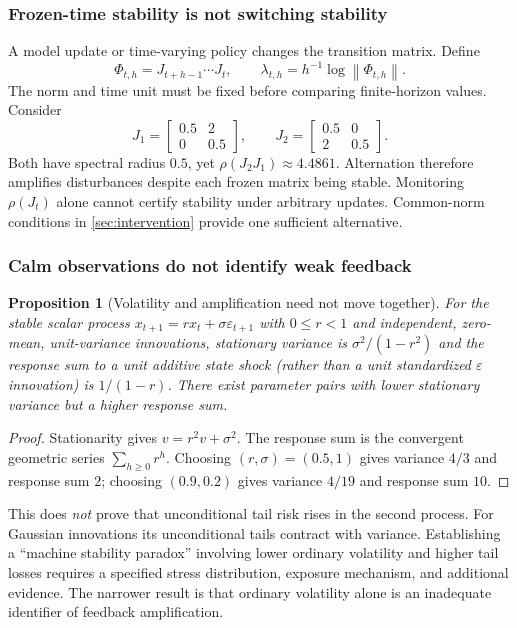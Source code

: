 \documentclass[10pt,twocolumn,letterpaper]{article}
\newtheorem{proposition}[theorem]{Proposition}
\theoremstyle{definition}
\theoremstyle{remark}
\newcommand{\norm}[1]{\left\lVert #1\right\rVert}
\begin{document}
\subsubsection{Frozen-time stability is not switching stability}
A model update or time-varying policy changes the transition matrix. Define
\begin{equation}
 \Phi_{t,h}=J_{t+h-1}\cdots J_t,\qquad
 \lambda_{t,h}=h^{-1}\log\norm{\Phi_{t,h}}.
 \label{eq:product}
\end{equation}
The norm and time unit must be fixed before comparing finite-horizon values. Consider
\begin{equation}
 J_1=\begin{bmatrix}0.5&2\\0&0.5\end{bmatrix},\qquad
 J_2=\begin{bmatrix}0.5&0\\2&0.5\end{bmatrix}.
 \label{eq:switch}
\end{equation}
Both have spectral radius $0.5$, yet $\rho(J_2J_1)\approx4.4861$. Alternation therefore amplifies disturbances despite each frozen matrix being stable. Monitoring $\rho(J_t)$ alone cannot certify stability under arbitrary updates. Common-norm conditions in \cref{sec:intervention} provide one sufficient alternative.

\subsubsection{Calm observations do not identify weak feedback}
\begin{proposition}[Volatility and amplification need not move together]
\label{prop:vol}
For the stable scalar process $x_{t+1}=r x_t+\sigma\varepsilon_{t+1}$ with $0\leq r<1$ and independent, zero-mean, unit-variance innovations, stationary variance is $\sigma^2/(1-r^2)$ and the response sum to a unit additive state shock (rather than a unit standardized $\varepsilon$ innovation) is $1/(1-r)$. There exist parameter pairs with lower stationary variance but a higher response sum.
\end{proposition}
\begin{proof}
Stationarity gives $v=r^2v+\sigma^2$. The response sum is the convergent geometric series $\sum_{h\geq0}r^h$. Choosing $(r,\sigma)=(0.5,1)$ gives variance $4/3$ and response sum $2$; choosing $(0.9,0.2)$ gives variance $4/19$ and response sum $10$.
\end{proof}
This does \emph{not} prove that unconditional tail risk rises in the second process. For Gaussian innovations its unconditional tails contract with variance. Establishing a ``machine stability paradox'' involving lower ordinary volatility and higher tail losses requires a specified stress distribution, exposure mechanism, and additional evidence. The narrower result is that ordinary volatility alone is an inadequate identifier of feedback amplification.
\end{document}
